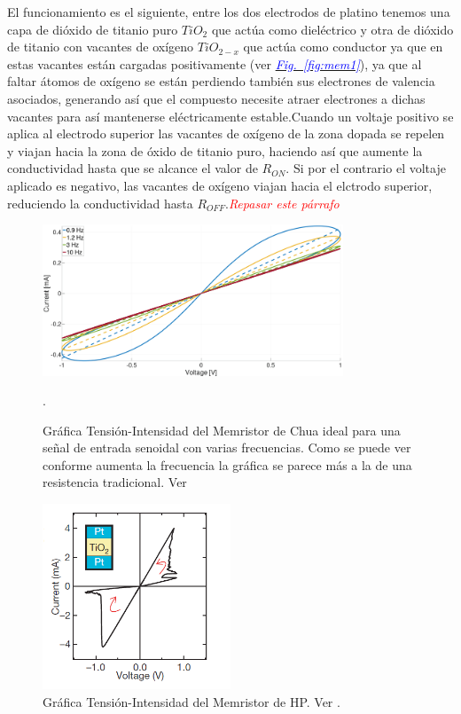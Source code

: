 \documentclass[12pt,a4paper]{report} %
\newcommand{\fref}[1]{\hyperref[#1]{\textcolor{blue}{\textit{Fig.~\ref*{#1}}}}}
\begin{document}
	El funcionamiento es el siguiente, entre los dos electrodos de platino tenemos una capa de dióxido de titanio puro $TiO_2$ que actúa como dieléctrico y otra de dióxido de titanio con vacantes de oxígeno $TiO_{2-x}$ que actúa como conductor ya que en estas vacantes están cargadas positivamente (ver \fref{fig:mem1}), ya que al faltar átomos de oxígeno se están perdiendo también sus electrones de valencia asociados, generando así que el compuesto necesite atraer electrones a dichas vacantes para así mantenerse eléctricamente estable.Cuando un voltaje positivo se aplica al electrodo superior las vacantes de oxígeno de la zona dopada se repelen y viajan hacia la zona de óxido de titanio puro, haciendo así que aumente la conductividad hasta que se alcance el valor de $R_{ON}$. Si por el contrario el voltaje aplicado es negativo, las vacantes de oxígeno viajan hacia el elctrodo superior, reduciendo la conductividad hasta $R_{OFF}$.\textit{\textcolor{red}{Repasar este párrafo}}
	
	\begin{figure}[h]
		\centering
		\includegraphics[width=0.8\textwidth]{iv_chua.png}
		\caption{Gráfica Tensión-Intensidad del Memristor de Chua ideal para una señal de entrada senoidal con varias frecuencias. Como se puede ver conforme aumenta la frecuencia la gráfica se parece más a la de una resistencia tradicional. Ver \cite{outsiders}}.
		\label{fig:iv_chua}
	\end{figure}\smallskip
	
		\begin{figure}[h]
		\centering
		\includegraphics[width=0.5\textwidth]{iv_hp.png}
		\caption{Gráfica Tensión-Intensidad del Memristor de HP. Ver \cite{HP}.}
		\label{fig:iv_hp}
	\end{figure}\smallskip
	
\end{document}
